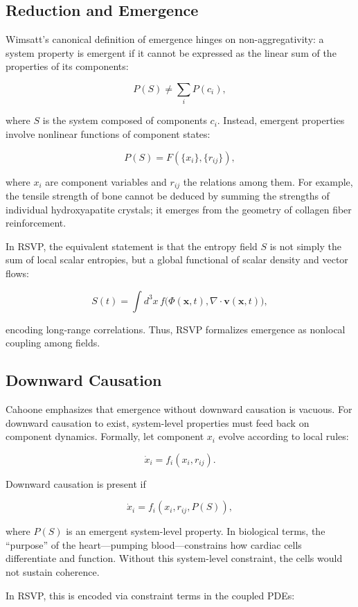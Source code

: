 \documentclass[12pt]{book}
\begin{document}
\subsection{Reduction and Emergence}
Wimsatt’s canonical definition of emergence hinges on non-aggregativity: a system property is emergent if it cannot be expressed as the linear sum of the properties of its components:

\[ P(S) \neq \sum_i P(c_i), \]

where \( S \) is the system composed of components \( c_i \). Instead, emergent properties involve nonlinear functions of component states:

\[ P(S) = F\left( \{x_i\}, \{r_{ij}\} \right), \]

where \( x_i \) are component variables and \( r_{ij} \) the relations among them. For example, the tensile strength of bone cannot be deduced by summing the strengths of individual hydroxyapatite crystals; it emerges from the geometry of collagen fiber reinforcement.

In RSVP, the equivalent statement is that the entropy field \( S \) is not simply the sum of local scalar entropies, but a global functional of scalar density and vector flows:

\[ S(t) = \int d^3x \, f\big(\Phi(\mathbf{x},t), \nabla \cdot \mathbf{v}(\mathbf{x},t)\big), \]

encoding long-range correlations. Thus, RSVP formalizes emergence as nonlocal coupling among fields.

\subsection{Downward Causation}
Cahoone emphasizes that emergence without downward causation is vacuous. For downward causation to exist, system-level properties must feed back on component dynamics. Formally, let component \( x_i \) evolve according to local rules:

\[ \dot{x}_i = f_i(x_i, r_{ij}). \]

Downward causation is present if

\[ \dot{x}_i = f_i(x_i, r_{ij}, P(S)), \]

where \( P(S) \) is an emergent system-level property. In biological terms, the “purpose” of the heart—pumping blood—constrains how cardiac cells differentiate and function. Without this system-level constraint, the cells would not sustain coherence.

In RSVP, this is encoded via constraint terms in the coupled PDEs:
\end{document}
